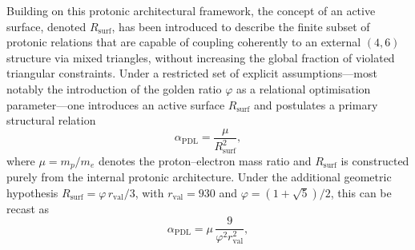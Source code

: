 \documentclass[11pt,a4paper]{article}
\begin{document}
Building on this protonic architectural framework, the concept of an active surface, denoted $R_{\mathrm{surf}}$, has been introduced to describe the finite subset of protonic relations that are capable of coupling coherently to an external $(4,6)$ structure via mixed triangles, without increasing the global fraction of violated triangular constraints.\cite{Laubscher2026DerivationAlpha} Under a restricted set of explicit assumptions—most notably the introduction of the golden ratio $\varphi$ as a relational optimisation parameter—one introduces an active surface $R_{\mathrm{surf}}$ and postulates a primary structural relation
\begin{equation}
\alpha_{\mathrm{PDL}} = \frac{\mu}{R_{\mathrm{surf}}^{2}},
\label{eq:alphaPDLIntro}
\end{equation}
where $\mu = m_p/m_e$ denotes the proton–electron mass ratio and $R_{\mathrm{surf}}$ is constructed purely from the internal protonic architecture.
Under the additional geometric hypothesis $R_{\mathrm{surf}} = \varphi\,r_{\mathrm{val}}/3$, with $r_{\mathrm{val}}=930$ and $\varphi = (1+\sqrt{5})/2$, this can be recast as
\begin{equation}
\alpha_{\mathrm{PDL}} = \mu\,\frac{9}{\varphi^{2} r_{\mathrm{val}}^{2}},
\end{equation}
\end{document}
